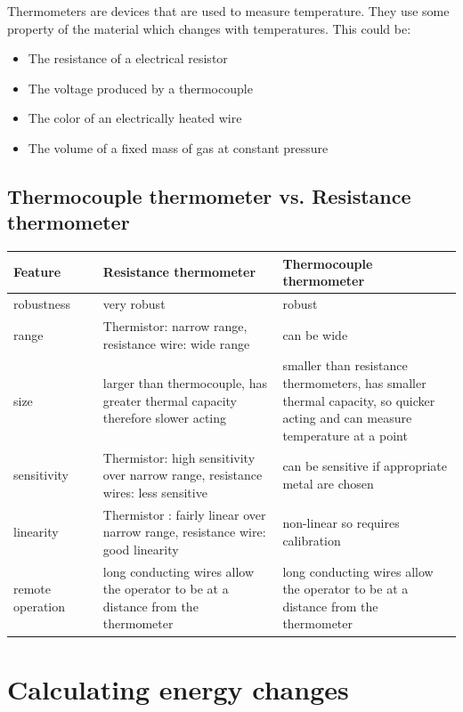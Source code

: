 \documentclass{scrbook}
\begin{document}
	Thermometers are devices that are used to measure temperature. They use some property of the material which changes with temperatures. This could be:

	\begin{itemize}
		\item
			The resistance of a electrical resistor
		\item
			The voltage produced by a thermocouple
		\item
			The color of an electrically heated wire
		\item
			The volume of a fixed mass of gas at constant pressure
	\end{itemize}

\subsection{Thermocouple thermometer vs. Resistance thermometer}


	\begin{tabular}{| p{0.2\linewidth} | p{0.4\linewidth} | p{0.4\linewidth} |}
		\hline
		Feature & Resistance thermometer & Thermocouple thermometer \\
		\hline
		robustness & very robust & robust \\
		range & Thermistor: narrow range, resistance wire: wide range & can be wide \\
		size & larger than thermocouple, has greater thermal capacity therefore slower acting & smaller than resistance thermometers, has smaller thermal capacity, so quicker acting and can measure temperature at a point \\
		sensitivity & Thermistor: high sensitivity over narrow range, resistance wires: less sensitive & can be sensitive if appropriate metal are chosen \\
		linearity & Thermistor : fairly linear over narrow range, resistance wire: good linearity & non-linear so requires calibration \\
		remote operation & long conducting wires allow the operator to be at a distance from the thermometer & long conducting wires allow the operator to be at a distance from the thermometer \\
		\hline
	\end{tabular}

\section{Calculating energy changes}
\end{document}
